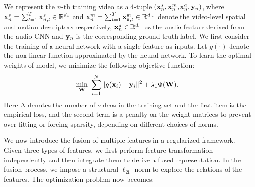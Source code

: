 \documentclass[journal]{IEEEtran}
\begin{document}
We represent the $n$-th training video as a 4-tuple $({\bf x}^s_n, {\bf x}^m_n, {\bf x}^a_n, {\bf y}_n)$, where ${\bf x}^s_n = \sum_{t=1}^T {{\bf x}^s_{n,t}}\in \mathbb{R}^{d_s}$ and ${\bf x}^m_n = \sum_{t=1}^T {{\bf x}^m_{n,t}} \in \mathbb{R}^{d_m}$ denote the video-level spatial and motion descriptors respectively, ${\bf x}^a_n \in \mathbb{R}^{d_a}$ as the audio feature derived from the audio CNN and ${\bf y}_n$ is the corresponding ground-truth label. We first consider the training of a neural network with a single feature as inputs. Let $g(\cdot)$ denote the non-linear function approximated by the neural network. To learn the optimal weights of model, we minimize the following objective function:
\begin{equation}
\label{eq:nn}
    \min_{{\bf W}} ~\sum_{i=1}^{N} \|  g({\bf x}_{i})-{\bf y}_i \|^2 + \lambda_1 \Phi({\bf W}).
\end{equation}
Here $N$ denotes the number of videos in the training set and the first item is the empirical loss, and the second term is a penalty on the weight matrices to prevent over-fitting or forcing sparsity, depending on different choices of norms. 

We now introduce the fusion of multiple features in a regularized framework. Given three types of features, we first perform feature transformation independently and then integrate them to derive a fused representation. In the fusion process, we impose a structural $\ell_{21}$ norm to explore the relations of the features. The optimization problem now becomes:
\end{document}
